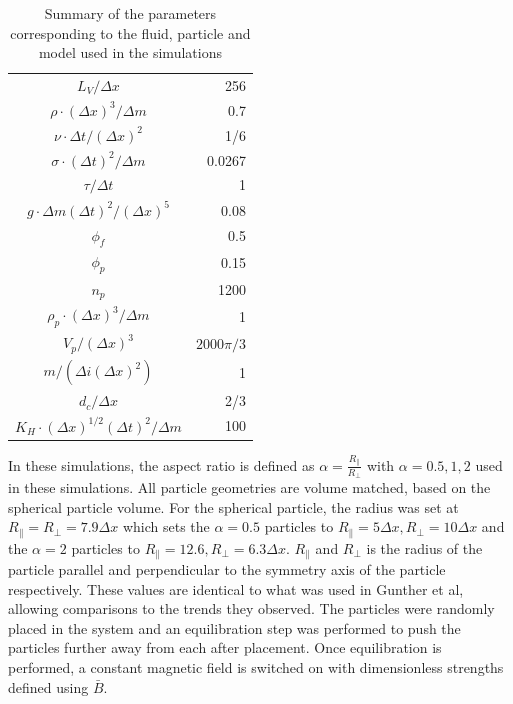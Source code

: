 \begin{table}
    \centering
    \caption{Summary of the parameters corresponding to the fluid, particle and model used in the simulations}
    \label{table:model_params}
    \begin{tabular}{|c|r|}
    \hline
    $L_V/\Delta x$ & 256 \\
    $\rho \cdot (\Delta x)^3/\Delta m$ & 0.7 \\
    $\nu \cdot \Delta t/(\Delta x)^2$ & 1/6 \\
    $\sigma \cdot (\Delta t)^2/\Delta m$ & 0.0267 \\
    $\tau/\Delta t$ & 1 \\
    $g \cdot \Delta m(\Delta t)^2/(\Delta x)^5$ & 0.08 \\
    $\phi_f$ & 0.5 \\
    $\phi_p$ & 0.15 \\
    $n_p$ & 1200 \\
    $\rho_p \cdot (\Delta x)^3/\Delta m$ & 1 \\
    $V_p/(\Delta x)^3$ & $2000\pi/3$ \\
    $m/(\Delta i(\Delta x)^2)$ & 1 \\
    $d_c/\Delta x$ & 2/3 \\
    $K_H\cdot (\Delta x)^{1/2}(\Delta t)^2/\Delta m$ & 100 \\
    \hline
    \end{tabular}
\end{table}

In these simulations, the aspect ratio is defined as $\alpha = \frac{R_{\parallel}}{R_{\perp}}$ with $\alpha = 0.5, 1, 2$ 
used in these simulations. All particle geometries are volume matched, based on the spherical particle volume. For the 
spherical particle, the radius was set at $R_{\parallel} = R_{\perp} = 7.9 \Delta x$ which sets the $\alpha = 0.5$ particles to 
$R_{\parallel} = 5 \Delta x, R_{\perp} = 10 \Delta x$ and the $\alpha = 2$ particles to $R_{\parallel} = 12.6, R_{\perp} = 6.3 \Delta x$. 
$R_{\parallel}$ and $R_{\perp}$ is the radius of the particle parallel and perpendicular to the symmetry axis of 
the particle respectively. These values are identical to what was used in Gunther et al, allowing comparisons to the 
trends they observed. \cite{gunther_timescales_2014} The particles were randomly placed in the system and an equilibration
step was performed to push the particles further away from each after placement. Once equilibration is performed, a 
constant magnetic field is switched on with dimensionless strengths defined using $\bar{B}$.

